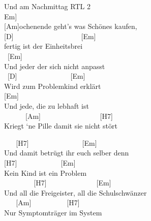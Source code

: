 \documentclass[
  letterpaper,
  twoside=false]{scrbook}
\begin{document}
Und am Nachmittag RTL 2\\
\hspace*{0.333em}{[}Em{]}\\
{[}Am{]}ochenende geht's was Schönes kaufen,\\
{[}D{]} ~ ~ ~ ~ ~ ~ ~ ~ ~ ~ ~ {[}Em{]}\\
fertig ist der Einheitsbrei\\
\hspace*{0.333em} ~{[}Em{]}\\
Und jeder der sich nicht anpasst\\
\hspace*{0.333em} ~{[}D{]} ~ ~ ~ ~ ~ ~ ~ ~ ~{[}Em{]}\\
Wird zum Problemkind erklärt\\
\hspace*{0.333em} {[}Em{]}\\
Und jede, die zu lebhaft ist\\
\hspace*{0.333em} ~ ~ ~ ~{[}Am{]} ~ ~ ~ ~ ~ ~ ~ ~ ~ ~{[}H7{]}\\
Kriegt `ne Pille damit sie nicht stört

~ ~ {[}H7{]} ~ ~ ~ ~ ~ ~ ~ ~ ~{[}Em{]}\\
Und damit betrügt ihr euch selber denn\\
{[}H7{]} ~ ~ ~ ~ ~ ~ ~ {[}Em{]}\\
Kein Kind ist ein Problem\\
\hspace*{0.333em} ~ ~ ~ ~ ~ {[}H7{]} ~ ~ ~ ~ ~ ~ ~ ~ {[}Em{]}\\
Und all die Freigeister, all die Schulschwänzer\\
\hspace*{0.333em} ~ ~ {[}Am{]} ~ ~ ~ ~ ~ ~{[}H7{]}\\
Nur Symptomträger im System
\end{document}
